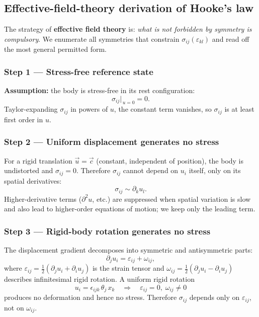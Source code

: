 \subsection*{Effective-field-theory derivation of Hooke's law}

The strategy of \textbf{effective field theory} is: \emph{what is not forbidden by symmetry is compulsory}. We enumerate all symmetries that constrain $\sigma_{ij}(\varepsilon_{kl})$ and read off the most general permitted form.

\subsubsection*{Step 1 — Stress-free reference state}

\textbf{Assumption:} the body is stress-free in its rest configuration:
\[
    \sigma_{ij}\bigl|_{\,u=0} = 0.
\]
Taylor-expanding $\sigma_{ij}$ in powers of $u$, the constant term vanishes, so $\sigma_{ij}$ is at least first order in $u$.

\subsubsection*{Step 2 — Uniform displacement generates no stress}

For a rigid translation $\vec{u} = \vec{c}$ (constant, independent of position), the body is undistorted and $\sigma_{ij}=0$. Therefore $\sigma_{ij}$ cannot depend on $u_i$ itself, only on its spatial derivatives:
\[
    \sigma_{ij} \sim \partial_k u_l.
\]
Higher-derivative terms ($\partial^2 u$, etc.) are suppressed when spatial variation is slow and also lead to higher-order equations of motion; we keep only the leading term.

\subsubsection*{Step 3 — Rigid-body rotation generates no stress}

The displacement gradient decomposes into symmetric and antisymmetric parts:
\[
    \partial_j u_i = \varepsilon_{ij} + \omega_{ij},
\]
where $\varepsilon_{ij}=\tfrac{1}{2}(\partial_j u_i + \partial_i u_j)$ is the strain tensor and $\omega_{ij}=\tfrac{1}{2}(\partial_j u_i - \partial_i u_j)$ describes infinitesimal rigid rotation. A uniform rigid rotation
\[
    u_i = \epsilon_{ijk}\,\theta_j\,x_k \quad \Longrightarrow \quad \varepsilon_{ij} = 0,\; \omega_{ij} \neq 0
\]
produces no deformation and hence no stress. Therefore $\sigma_{ij}$ depends only on $\varepsilon_{ij}$, not on $\omega_{ij}$.

